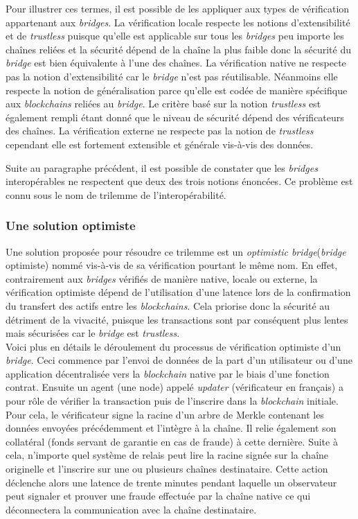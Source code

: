 Pour illustrer ces termes, il est possible de les appliquer aux types de vérification appartenant aux \textit{bridges}. La vérification locale respecte les notions d’extensibilité et de \textit{trustless} puisque qu'elle est applicable sur tous les \textit{bridges} peu importe les chaînes reliées et la sécurité dépend de la chaîne la plus faible donc la sécurité du \textit{bridge} est bien équivalente à l’une des chaînes.
La vérification native ne respecte pas la notion d’extensibilité car le \textit{bridge} n’est pas réutilisable. Néanmoins elle respecte la notion de généralisation parce qu’elle est codée de manière spécifique aux \textit{blockchains} reliées au \textit{bridge}. Le critère basé sur la notion \textit{trustless} est également rempli étant donné que le niveau de sécurité dépend des vérificateurs des chaînes.
La vérification externe ne respecte pas la notion de \textit{trustless} cependant elle est fortement extensible et générale vis-à-vis des données. \cite{NgraveVerif}

 Suite au paragraphe précédent, il est possible de constater que les \textit{bridges} interopérables ne respectent que deux des trois notions énoncées. Ce problème est connu sous le nom de trilemme de l’interopérabilité. 

\subsubsection{Une solution optimiste}

Une solution proposée pour résoudre ce trilemme est un \textit{optimistic bridge}(\textit{bridge} optimiste) nommé vis-à-vis de sa vérification pourtant le même nom\cite{OptimisticBhuptani}. En effet, contrairement aux \textit{bridges} vérifiés de manière native, locale ou externe, la vérification optimiste dépend de l’utilisation d’une latence lors de la confirmation du transfert des actifs entre les \textit{blockchains}. Cela priorise donc la sécurité au détriment de la vivacité, puisque les transactions sont par conséquent plus lentes mais sécurisées car le \textit{bridge} est \textit{trustless}. \\

Voici plus en détails le déroulement du processus de vérification optimiste d’un \textit{bridge}.
Ceci commence par l’envoi de données de la part d’un utilisateur ou d’une application décentralisée vers la \textit{blockchain} native par le biais d’une fonction contrat.
Ensuite un agent (une node) appelé \textit{updater} (vérificateur en français) a pour rôle de vérifier la transaction puis de l’inscrire dans la \textit{blockchain} initiale. Pour cela, le vérificateur signe la racine d’un arbre de Merkle contenant les données envoyées précédemment et l’intègre à la chaîne. Il relie également son collatéral (fonds servant de garantie en cas de fraude) à cette dernière.
Suite à cela, n’importe quel système de relais peut lire la racine signée sur la chaîne originelle et l’inscrire sur une ou plusieurs chaînes destinataire. Cette action déclenche alors une latence de trente minutes pendant laquelle un observateur peut signaler et prouver une fraude effectuée par la chaîne native ce qui déconnectera la communication avec la chaîne destinataire. 

